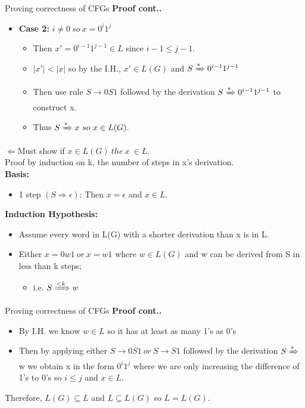 \documentclass{beamer}
\begin{document}
\begin{frame}{Proving correctness of CFGs}
	\textbf{Proof cont.. }
	
		\begin{itemize}
			\item	\textbf{Case 2:} $i \neq 0\  so\  x = 0^i1^j $
			\begin{itemize}
				\item Then $x' = 0^{i-1}1^{j-1}\in L$ since $i-1 \leq j-1.$
				\item $|x'| < |x|$ so by the I.H., $x' \in L(G)$ and $S\xRightarrow{*} 0^{i-1}1^{j-1}$
				\item Then use rule $S \rightarrow 0S1$ followed by the derivation $S \xRightarrow{*} 0^{i-1}1^{j-1}$ to construct x. 
				\item Thus $S\xRightarrow{*} x\  so\  x \in L(G).$ 
			\end{itemize}
		\end{itemize}	
\textbf{$\Leftarrow$}Must show if $x \in L(G)\  the\  x\  \in L.$\\
Proof by induction on k, the number of steps in x's derivation.\\
\textbf{Basis:} 
\begin{itemize}
	\item 1 step $(S\Rightarrow \epsilon)$: Then $x = \epsilon$ and $x \in L.$ 
\end{itemize}
\textbf{Induction Hypothesis:}
\begin{itemize}
	\item  Assume every word in L(G) with a shorter derivation than x is in L.
	\item Either $x = 0w1\  or\  x = w1$ where $w \in L(G)$ and w can be derived from S in less than k steps;
	\begin{itemize}
		\item i.e. $S \xRightarrow{<k}w$
	\end{itemize}
\end{itemize}
\end{frame}
\begin{frame}{Proving correctness of CFGs}
	\textbf{Proof cont.. }
	
	\begin{itemize}
		\item	By I.H. we know $w \in L$ so it has at least as many 1's as 0's
		\item Then by applying either $S \rightarrow 0S1 \ or\  S \rightarrow S1$ followed by the derivation $S \xRightarrow{*}$ w we obtain x in the form $0^i1^j$	where we are only increasing the difference of 1's to 0's so $i \leq j$ and $x \in L.$
	\end{itemize}	
Therefore, $L(G) \subseteq L$ and $L \subseteq L(G)$ so $L = L(G).$
\end{frame}
\end{document}
